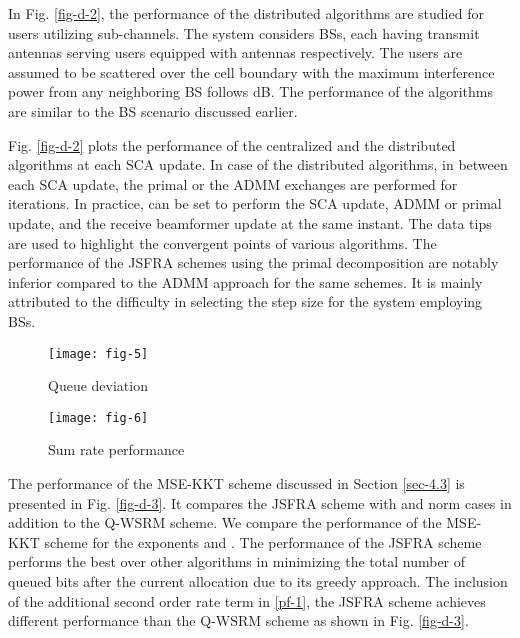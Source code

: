 In Fig. \ref{fig-d-2}, the performance of the distributed algorithms are studied for  users utilizing  sub-channels. The system considers  \acp{BS}, each having  transmit antennas serving  users equipped with  antennas respectively. The users are assumed to be scattered over the cell boundary with the maximum interference power from any neighboring \ac{BS} follows  dB. The performance of the algorithms are similar to the  \ac{BS} scenario discussed earlier.

Fig. \ref{fig-d-2} plots the performance of the centralized and the distributed algorithms at each \ac{SCA} update. In case of the distributed algorithms, in between each \ac{SCA} update, the primal or the \ac{ADMM} exchanges are performed for  iterations. In practice,  can be set to perform the \ac{SCA} update, \ac{ADMM} or primal update, and the receive beamformer  update at the same instant. The data tips are used to highlight the convergent points of various algorithms. The performance of the \ac{JSFRA} schemes using the primal decomposition are notably inferior compared to the \ac{ADMM} approach for the same schemes. It is mainly attributed to the difficulty in selecting the step size for the system employing  \acp{BS}.
\begin{figure*}
\centering
\begin{subfigure}{0.49\textwidth}
\texttt{[image: fig-5]}
\caption{Queue deviation}
\end{subfigure}
\hfill
\begin{subfigure}{0.49\textwidth}
\texttt{[image: fig-6]}
\caption{Sum rate performance}
\end{subfigure}
\caption{Convergence plot for  model}
\label{fig-d-2}
\end{figure*}

The performance of the \ac{MSE}-\ac{KKT} scheme discussed in Section \ref{sec-4.3} is presented in Fig. \ref{fig-d-3}. It compares the \ac{JSFRA} scheme with  and  norm cases in addition to the \ac{Q-WSRM} scheme. We compare the performance of the \ac{MSE}-\ac{KKT} scheme for the exponents  and . The performance of the  \ac{JSFRA} scheme performs the best over other algorithms in minimizing the total number of queued bits after the current allocation due to its greedy approach. The inclusion of the additional second order rate term in \eqref{pf-1}, the  \ac{JSFRA} scheme achieves different performance than the \ac{Q-WSRM} scheme as shown in Fig. \ref{fig-d-3}. 

